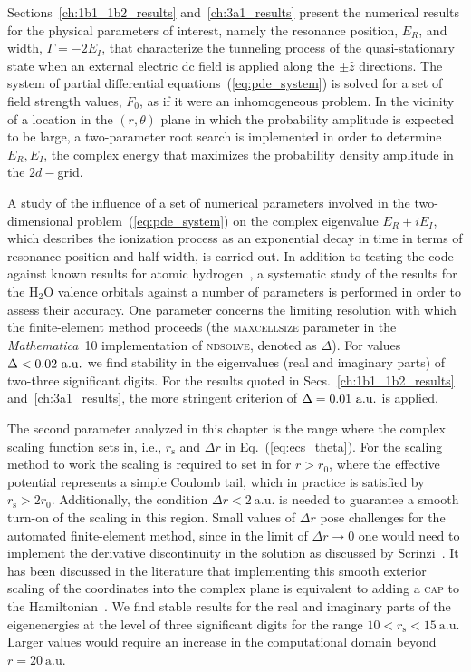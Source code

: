 Sections~\ref{ch:1b1_1b2_results} and~\ref{ch:3a1_results} present the
numerical results for the physical parameters of interest, namely the
resonance position, $E_{R}$, and width, $\Gamma = -2E_{I}$, that
characterize the tunneling process of the quasi-stationary state when
an external electric dc field is applied along the $\pm\hat{z}$
directions. The system of partial differential
equations~(\ref{eq:pde_system}) is solved for a set of field strength
values, $F_{0}$, as if it were an inhomogeneous problem. In the
vicinity of a location in the $(r,\theta)$ plane in which the
probability amplitude is expected to be large, a two-parameter root
search is implemented in order to determine ${E_{R}, E_{I}}$, the
complex energy that maximizes the probability density amplitude in the
$2d-$grid.

A study of the influence of a set of numerical parameters involved in
the two-dimensional problem~(\ref{eq:pde_system}) on the complex
eigenvalue $E_{R}+iE_{I}$, which describes the ionization process as
an exponential decay in time in terms of resonance position and
half-width, is carried out. In addition to testing the code against
known results for atomic hydrogen~\cite{Telnov_1989}, a systematic
study of the results for the H$_{2}$O valence orbitals against a
number of parameters is performed in order to assess their
accuracy. One parameter concerns the limiting resolution with which
the finite-element method proceeds (the \textsc{maxcellsize} parameter
in the \emph{Mathematica}~10 implementation of \textsc{ndsolve},
denoted as $\Delta$). For values $\Delta < 0.02\ \rm{a.u.}$ we find
stability in the eigenvalues (real and imaginary parts) of two-three
significant digits. For the results quoted in
Secs.~\ref{ch:1b1_1b2_results} and~\ref{ch:3a1_results}, the more
stringent criterion of $\Delta=0.01\ \rm{a.u.}$ is applied.

The second parameter analyzed in this chapter is the range where the
complex scaling function sets in, i.e., $r_{\mathrm{s}}$ and $\Delta
r$ in Eq.~(\ref{eq:ecs_theta}). For the scaling method to work the
scaling is required to set in for $r > r_0$, where the effective
potential represents a simple Coulomb tail, which in practice is
satisfied by $r_{\mathrm{s}} > 2r_{0}$. Additionally, the condition
$\Delta r < 2\ \mathrm{a.u.}$ is needed to guarantee a smooth turn-on
of the scaling in this region. Small values of $\Delta r$ pose
challenges for the automated finite-element method, since in the limit
of $\Delta r \to 0$ one would need to implement the derivative
discontinuity in the solution as discussed by
Scrinzi~\cite{ecsScrinzi}. It has been discussed in the literature
that implementing this smooth exterior scaling of the coordinates into
the complex plane is equivalent to adding a \textsc{cap} to the
Hamiltonian~\cite{ECS_sim_CAP_1991,ECS_sim_CAP_1998}. We find stable
results for the real and imaginary parts of the eigenenergies at the
level of three significant digits for the range $10 < r_{\mathrm{s}} <
15\ \mathrm{a.u.}$ Larger values would require an increase in the
computational domain beyond $r = 20\ \mathrm{a.u.}$

